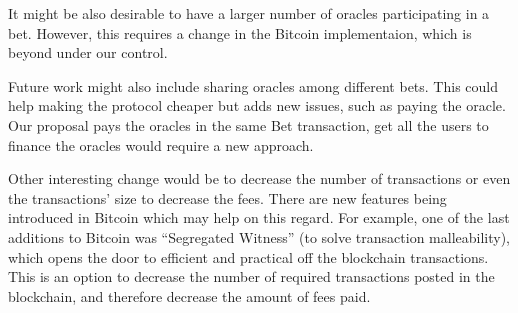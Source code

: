 It might be also desirable to have a larger number of oracles participating in
  a bet.
However, this requires a change in the Bitcoin implementaion, which is beyond
  under our control.

Future work might also include sharing oracles among different bets.
This could help making the protocol cheaper but adds new issues, such as paying
  the oracle.
Our proposal pays the oracles in the same Bet transaction, get all the users to
  finance the oracles would require a new approach.

Other interesting change would be to decrease the number of transactions or
  even the transactions' size to decrease the fees.
There are new features being introduced in Bitcoin which may help on this
  regard.
For example, one of the last additions to Bitcoin was ``Segregated Witness''
  (to solve transaction malleability), which opens the door to efficient and
  practical off the blockchain transactions.
This is an option to decrease the number of required transactions posted in the
  blockchain, and therefore decrease the amount of fees paid.
